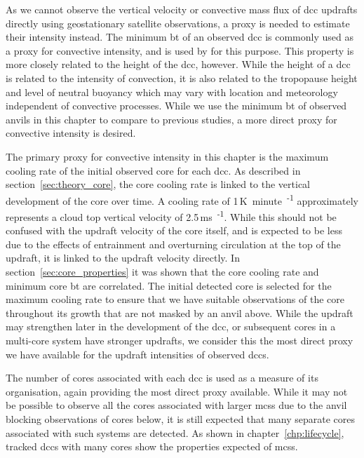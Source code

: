 As we cannot observe the vertical velocity or convective mass flux of \acrshort{dcc} updrafts directly using geostationary satellite observations, a proxy is needed to estimate their intensity instead.
The minimum \acrshort{bt} of an observed \acrshort{dcc} is commonly used as a proxy for convective intensity, and is used by \citet{protopapadaki_upper_2017} for this purpose.
This property is more closely related to the height of the \acrshort{dcc}, however.
While the height of a \acrshort{dcc} is related to the intensity of convection, it is also related to the tropopause height and level of neutral buoyancy which may vary with location and meteorology independent of convective processes.
While we use the minimum \acrshort{bt} of observed anvils in this chapter to compare to previous studies, a more direct proxy for convective intensity is desired.

The primary proxy for convective intensity in this chapter is the maximum cooling rate of the initial observed core for each \acrshort{dcc}.
As described in section~\ref{sec:theory_core}, the core cooling rate is linked to the vertical development of the core over time.
A cooling rate of 1\,\unit{K minute\textsuperscript{-1}} approximately represents a cloud top vertical velocity of 2.5\,\unit{ms\textsuperscript{-1}}.
While this should not be confused with the updraft velocity of the core itself, and is expected to be less due to the effects of entrainment and overturning circulation at the top of the updraft, it is linked to the updraft velocity directly.
In section~\ref{sec:core_properties} it was shown that the core cooling rate and minimum core \acrshort{bt} are correlated.
The initial detected core is selected for the maximum cooling rate to ensure that we have suitable observations of the core throughout its growth that are not masked by an anvil above.
While the updraft may strengthen later in the development of the \acrshort{dcc}, or subsequent cores in a multi-core system have stronger updrafts, we consider this the most direct proxy we have available for the updraft intensities of observed \acrshort{dcc}s.

The number of cores associated with each \acrshort{dcc} is used as a measure of its organisation, again providing the most direct proxy available.
While it may not be possible to observe all the cores associated with larger \acrshort{mcs}s due to the anvil blocking observations of cores below, it is still expected that many separate cores associated with such systems are detected.
As shown in chapter~\ref{chp:lifecycle}, tracked \acrshort{dcc}s with many cores show the properties expected of \acrshort{mcs}s.


